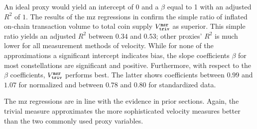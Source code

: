 An ideal proxy would yield an intercept of 0 and a $\beta$ equal to 1 with an
adjusted $R^{2}$ of $1$.  %
The results of the \ac{mz} regressions in  confirm the
simple ratio of inflated on-chain transaction volume to total coin supply
${V_{\mathtt{triv}}^{\mathtt{msr}}}$ as superior.  %
This simple ratio yields an adjusted $R^{2}$ between $0.34$ and $0.53$; other
proxies' $R^{2}$ is much lower for all measurement methods of velocity.  %
While for none of the approximations a significant intercept indicates bias,
the slope coefficients $\beta$ for most constellations are significant and
positive.  %
Furthermore, with respect to the $\beta$ coefficients, ${V_{\mathtt{triv}}^{\mathtt{msr}}}$ performs
best.  %
The latter shows coefficients between $0.99$ and $1.07$ for normalized and
between $0.78$ and $0.80$ for standardized data.  %

The \ac{mz} regressions are in line with the evidence in prior sections.  %
Again, the trivial measure approximates the more sophisticated velocity
measures better than the two commonly used proxy variables.  %



% 
%
%
